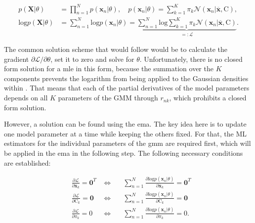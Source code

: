 \begin{equation*}
    \begin{aligned}
        p(\bm{X}|\theta) &= \prod\limits_{n=1}^Np(\bm{x}_n|\theta), \quad p(\bm{x}_n|\theta)=\sum\limits^K_{k=1}\pi_k\mathcal{N}(\bm{x}_n| \overline{\bm{x}}, \bm{\mathrm{C}}),\\[5pt]
        \mathrm{log}p(\bm{X}|\theta) &= \sum\limits_{n=1}^N \mathrm{log} p(\bm{x}_n|\theta) = \underbrace{ \sum\limits_{n=1}^N \mathrm{log} \sum\limits_{k=1}^K \pi_k \mathcal{N}(\bm{x}_n | \overline{\bm{x}}, \bm{\mathrm{C}})}_{=:\mathcal{L}}.
    \end{aligned}
\end{equation*}

The common solution scheme that would follow would be to calculate the gradient $\partial{\mathcal{L}}/\partial{\theta}$, set it to zero and solve for $\theta$. Unfortunately, there is no closed form solution for a \acrshort{mle} in this form, because the summation over the $K$ components prevents the logarithm from being applied to the Gaussian densities within \cite[p. 435]{bis_2006}. That means that each of the partial derivatives of the model parameters depends on all $K$ parameters of the GMM through $r_{nk}$, which prohibits a closed form solution. 

However, a solution can be found using the \acrshort{ema}. The key idea here is to update one model parameter at a time while keeping the others fixed. For that, the ML estimators for the individual parameters of the \acrshort{gmm} are required first, which will be applied in the \acrshort{ema} in the following step. The following necessary conditions are established:

\begin{equation*}
    \begin{aligned}
    &\frac{\partial{\mathcal{L}}}{\partial{\overline{\bm{x}}_k}} = \bm{0}^T \; &\Longleftrightarrow \quad &\sum\limits_{n=1}^N\frac{\partial{\mathrm{log}p(\bm{x}_n| \theta)}}{\partial{\overline{\bm{x}}_k}} = \bm{0}^T\\[5pt]
    &\frac{\partial{\mathcal{L}}}{\partial{\bm{\mathrm{C}}_k}} = \bm{0} \; &\Longleftrightarrow \quad &\sum\limits_{n=1}^N\frac{\partial{\mathrm{log}p(\bm{x}_n| \theta)}}{\partial{\bm{\mathrm{C}}_k}} = \bm{0}\\[5pt]
    &\frac{\partial{\mathcal{L}}}{\partial{\pi_k}} = 0 \; &\Longleftrightarrow \quad &\sum\limits_{n=1}^N\frac{\partial{\mathrm{log}p(\bm{x}_n| \theta)}}{\partial{\pi_k}} = 0.\\
    \end{aligned}
\end{equation*}

